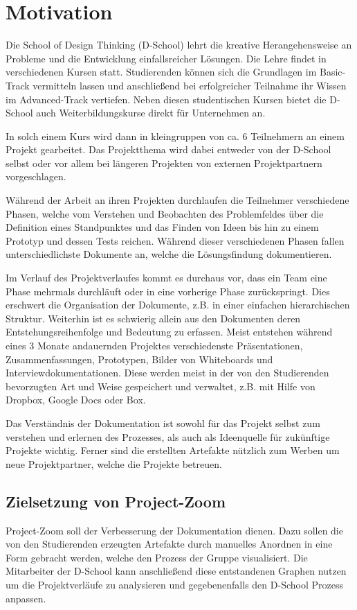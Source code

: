 \chapter{Motivation}
\label{chap:Einleitung}
Die School of Design Thinking (D-School) lehrt die kreative Herangehensweise an Probleme und die Entwicklung einfallsreicher Lösungen. Die Lehre findet in verschiedenen Kursen statt. Studierenden können sich die Grundlagen im Basic-Track vermitteln lassen und anschließend bei erfolgreicher Teilnahme ihr Wissen im  Advanced-Track vertiefen. Neben diesen studentischen Kursen bietet die D-School auch Weiterbildungskurse direkt für Unternehmen an.

In solch einem Kurs wird dann in kleingruppen von ca. 6 Teilnehmern an einem Projekt gearbeitet. Das Projektthema wird dabei entweder von der D-School selbst oder vor allem bei längeren Projekten von externen Projektpartnern vorgeschlagen. 

Während der Arbeit an ihren Projekten durchlaufen die Teilnehmer verschiedene Phasen, welche vom Verstehen und Beobachten des Problemfeldes über die Definition eines Standpunktes und das Finden von Ideen bis hin zu einem Prototyp und dessen Tests reichen. Während dieser verschiedenen Phasen fallen unterschiedlichste Dokumente an, welche die Lösungsfindung dokumentieren.

Im Verlauf des Projektverlaufes kommt es durchaus vor, dass ein Team eine Phase mehrmals durchläuft oder in eine vorherige Phase zurückspringt. Dies erschwert die Organisation der Dokumente, z.B. in einer einfachen hierarchischen Struktur. Weiterhin ist es schwierig allein aus den Dokumenten deren Entstehungsreihenfolge und Bedeutung zu erfassen. Meist entstehen während eines 3 Monate andauernden Projektes verschiedenste Präsentationen, Zusammenfassungen, Prototypen, Bilder von Whiteboards und Interviewdokumentationen. Diese werden meist in der von den Studierenden bevorzugten Art und Weise gespeichert und verwaltet, z.B. mit Hilfe von Dropbox, Google Docs oder Box.

Das Verständnis der Dokumentation ist sowohl für das Projekt selbst zum verstehen und erlernen des Prozesses, als auch als Ideenquelle für zukünftige Projekte wichtig. Ferner sind die erstellten Artefakte nützlich zum Werben um neue Projektpartner, welche die Projekte betreuen. 


\section{Zielsetzung von Project-Zoom}
Project-Zoom soll der Verbesserung der Dokumentation dienen. Dazu sollen die von den Studierenden erzeugten Artefakte durch manuelles Anordnen in eine Form gebracht werden, welche den Prozess der Gruppe visualisiert. Die Mitarbeiter der D-School kann anschließend diese entstandenen Graphen nutzen um die Projektverläufe zu analysieren und gegebenenfalls den D-School Prozess anpassen.

